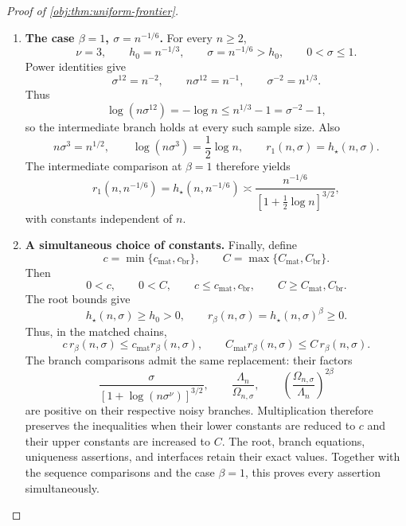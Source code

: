\begin{proof}[Proof of \cref{obj:thm:uniform-frontier}]
\begin{enumerate}
\item \textbf{The case \(\beta=1\), \(\sigma=n^{-1/6}\).}
For every \(n\ge2\),
\[
\nu=3,\qquad h_0=n^{-1/3},\qquad
\sigma=n^{-1/6}>h_0,\qquad 0<\sigma\le1.
\]
Power identities give
\[
\sigma^{12}=n^{-2},\qquad
n\sigma^{12}=n^{-1},\qquad
\sigma^{-2}=n^{1/3}.
\]
Thus
\[
\log(n\sigma^{12})=-\log n
\le n^{1/3}-1=\sigma^{-2}-1,
\]
so the intermediate branch holds at every such sample size. Also
\[
n\sigma^3=n^{1/2},
\qquad
\log(n\sigma^3)=\frac12\log n,
\qquad
r_1(n,\sigma)=h_\star(n,\sigma).
\]
The intermediate comparison at \(\beta=1\) therefore yields
\[
r_1(n,n^{-1/6})
=h_\star(n,n^{-1/6})
\asymp
\frac{n^{-1/6}}{[1+\tfrac12\log n]^{3/2}},
\]
with constants independent of \(n\).

\item \textbf{A simultaneous choice of constants.}
Finally, define
\[
c=\min\{c_{\mathrm{mat}},c_{\mathrm{br}}\},
\qquad
C=\max\{C_{\mathrm{mat}},C_{\mathrm{br}}\}.
\]
Then
\[
0<c,\qquad 0<C,\qquad
c\le c_{\mathrm{mat}},c_{\mathrm{br}},
\qquad
C\ge C_{\mathrm{mat}},C_{\mathrm{br}}.
\]
The root bounds give
\[
h_\star(n,\sigma)\ge h_0>0,
\qquad
r_\beta(n,\sigma)=h_\star(n,\sigma)^\beta\ge0.
\]
Thus, in the matched chains,
\[
c\,r_\beta(n,\sigma)
\le c_{\mathrm{mat}}r_\beta(n,\sigma),
\qquad
C_{\mathrm{mat}}r_\beta(n,\sigma)
\le C\,r_\beta(n,\sigma).
\]
The branch comparisons admit the same replacement: their factors
\[
\frac{\sigma}{[1+\log(n\sigma^\nu)]^{3/2}},
\qquad
\frac{\Lambda_n}{\Omega_{n,\sigma}},
\qquad
\left(\frac{\Omega_{n,\sigma}}{\Lambda_n}\right)^{2\beta}
\]
are positive on their respective noisy branches. Multiplication therefore
preserves the inequalities when their lower constants are reduced to \(c\)
and their upper constants are increased to \(C\). The root, branch equations,
uniqueness assertions, and interfaces retain their exact values. Together
with the sequence comparisons and the case \(\beta=1\), this proves every
assertion simultaneously.
\end{enumerate}
\end{proof}

